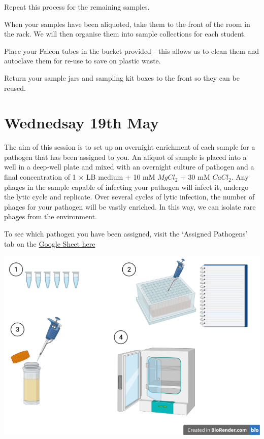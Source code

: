 \documentclass[
]{book}
\begin{document}
Repeat this process for the remaining samples.

When your samples have been aliquoted, take them to the front of the room in the rack. We will then organise them into sample collections for each student.

Place your Falcon tubes in the bucket provided - this allows us to clean them and autoclave them for re-use to save on plastic waste.

Return your sample jars and sampling kit boxes to the front so they can be reused.

\hypertarget{wednedsay-19th-may}{%
\section{Wednedsay 19th May}\label{wednedsay-19th-may}}

The aim of this session is to set up an overnight enrichment of each sample for a pathogen that has been assigned to you. An aliquot of sample is placed into a well in a deep-well plate and mixed with an overnight culture of pathogen and a final concentration of 1 \(\times\) LB medium + 10 mM \(MgCl_{2}\) + 30 mM \(CaCl_{2}\). Any phages in the sample capable of infecting your pathogen will infect it, undergo the lytic cycle and replicate. Over several cycles of lytic infection, the number of phages for your pathogen will be vastly enriched. In this way, we can isolate rare phages from the environment.

To see which pathogen you have been assigned, visit the `Assigned Pathogens' tab on the \href{https://docs.google.com/spreadsheets/d/1V6doztAX4AQ5657eH5r0GbJj_GnfMxTe4eKh7metXl0/edit?usp=sharing}{Google Sheet here}

\includegraphics{images/enrichment-1.png}
\end{document}
